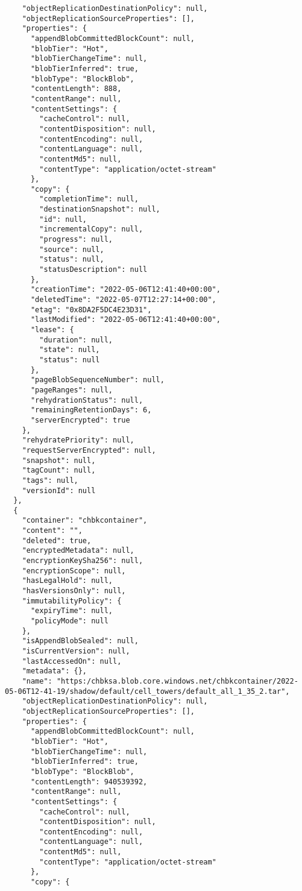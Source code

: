 \begin{verbatim}
    "objectReplicationDestinationPolicy": null,
    "objectReplicationSourceProperties": [],
    "properties": {
      "appendBlobCommittedBlockCount": null,
      "blobTier": "Hot",
      "blobTierChangeTime": null,
      "blobTierInferred": true,
      "blobType": "BlockBlob",
      "contentLength": 888,
      "contentRange": null,
      "contentSettings": {
        "cacheControl": null,
        "contentDisposition": null,
        "contentEncoding": null,
        "contentLanguage": null,
        "contentMd5": null,
        "contentType": "application/octet-stream"
      },
      "copy": {
        "completionTime": null,
        "destinationSnapshot": null,
        "id": null,
        "incrementalCopy": null,
        "progress": null,
        "source": null,
        "status": null,
        "statusDescription": null
      },
      "creationTime": "2022-05-06T12:41:40+00:00",
      "deletedTime": "2022-05-07T12:27:14+00:00",
      "etag": "0x8DA2F5DC4E23D31",
      "lastModified": "2022-05-06T12:41:40+00:00",
      "lease": {
        "duration": null,
        "state": null,
        "status": null
      },
      "pageBlobSequenceNumber": null,
      "pageRanges": null,
      "rehydrationStatus": null,
      "remainingRetentionDays": 6,
      "serverEncrypted": true
    },
    "rehydratePriority": null,
    "requestServerEncrypted": null,
    "snapshot": null,
    "tagCount": null,
    "tags": null,
    "versionId": null
  },
  {
    "container": "chbkcontainer",
    "content": "",
    "deleted": true,
    "encryptedMetadata": null,
    "encryptionKeySha256": null,
    "encryptionScope": null,
    "hasLegalHold": null,
    "hasVersionsOnly": null,
    "immutabilityPolicy": {
      "expiryTime": null,
      "policyMode": null
    },
    "isAppendBlobSealed": null,
    "isCurrentVersion": null,
    "lastAccessedOn": null,
    "metadata": {},
    "name": "https:/chbksa.blob.core.windows.net/chbkcontainer/2022-05-06T12-41-19/shadow/default/cell_towers/default_all_1_35_2.tar",
    "objectReplicationDestinationPolicy": null,
    "objectReplicationSourceProperties": [],
    "properties": {
      "appendBlobCommittedBlockCount": null,
      "blobTier": "Hot",
      "blobTierChangeTime": null,
      "blobTierInferred": true,
      "blobType": "BlockBlob",
      "contentLength": 940539392,
      "contentRange": null,
      "contentSettings": {
        "cacheControl": null,
        "contentDisposition": null,
        "contentEncoding": null,
        "contentLanguage": null,
        "contentMd5": null,
        "contentType": "application/octet-stream"
      },
      "copy": {

\end{verbatim}
